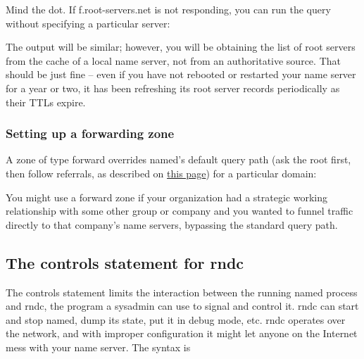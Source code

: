 Mind the dot. If f.root-servers.net is not responding, you can run the
query without specifying a particular server:


The output will be similar; however, you will be obtaining the list of
root servers from the cache of a local name server, not from an
authoritative source. That should be just fine -- even if you have not
rebooted or restarted your name server for a year or two, it has been
refreshing its root server records periodically as their TTLs expire.

\subsubsection[Setting up a forwarding
zone]{\texorpdfstring{\protect\hypertarget{part0024_split_044.htmlux5cux23_idTextAnchor917}{}{}Setting
up a forwarding zone}{Setting up a forwarding zone}}

\protect\hypertarget{part0024_split_044.htmlux5cux23_idIndexMarker2196}{}{}\protect\hypertarget{part0024_split_044.htmlux5cux23_idIndexMarker2197}{}{}A
zone of type {forward} overrides {named}'s default query path (ask the
root first, then follow referrals, as described on
\protect\hyperlink{part0024_split_015.htmlux5cux23_idTextAnchor859}{this
page}) for a particular domain:


You might use a {forward} zone if your organization had a strategic
working relationship with some other group or company and you wanted to
funnel traffic directly to that company's name servers, bypassing the
standard query path.

\protect\hypertarget{part0024_split_045.html}{}{}

\hypertarget{part0024_split_045.htmlux5cux23_idContainer1069}{}
\hypertarget{part0024_split_045.htmlux5cux23calibre_pb_44}{%
\subsection[The {controls} statement for
{rndc}]{\texorpdfstring{\protect\hypertarget{part0024_split_045.htmlux5cux23_idTextAnchor918}{}{}The
{controls} statement for
{rndc}}{The controls statement for rndc}}\label{part0024_split_045.htmlux5cux23calibre_pb_44}}

{\protect\hypertarget{part0024_split_045.htmlux5cux23_idIndexMarker2198}{}{}\protect\hypertarget{part0024_split_045.htmlux5cux23_idIndexMarker2199}{}{}\protect\hypertarget{part0024_split_045.htmlux5cux23_idIndexMarker2200}{}{}}The
{controls} statement limits the interaction between the running {named}
process and {rndc}, the program a sysadmin can use to signal and control
it. {rndc} can start and stop {named}, dump its state, put it in debug
mode, etc. {rndc} operates over the network, and with improper
configuration it might let anyone on the Internet mess with your name
server. The syntax is

